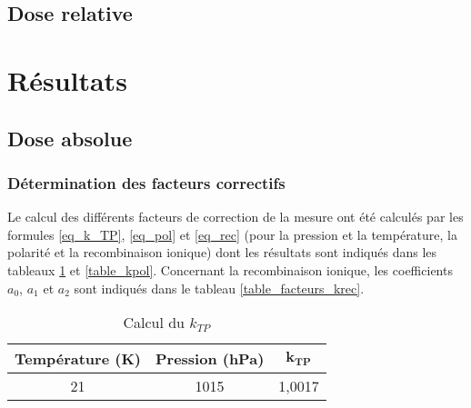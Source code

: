 \documentclass{article}
\begin{document}
\subsection{Dose relative}

\newpage
\section{Résultats}
\subsection{Dose absolue}
\subsubsection{Détermination des facteurs correctifs}

Le calcul des différents facteurs de correction de la mesure ont été calculés par les formules \ref*{eq_k_TP}, \ref*{eq_pol} et \ref*{eq_rec} (pour la pression et la température, la polarité et la recombinaison ionique) dont les résultats sont indiqués dans les tableaux \ref*{table_ktp} et \ref*{table_kpol}. Concernant la recombinaison ionique, les coefficients $a_0$, $a_1$ et $a_2$ sont indiqués dans le tableau \ref*{table_facteurs_krec}.

\begin{table}[h]
  \centering
  \begin{tabular}{ccc}
    \toprule
    \textbf{Température (K)} & \textbf{Pression (hPa)} & $\mathbf{k_{TP}}$ \\
    \toprule
    21 & 1015 & 1,0017 \\
    \bottomrule
  \end{tabular}
  \caption{Calcul du $k_{TP}$}
  \label{table_ktp}
\end{table}

\end{document}
